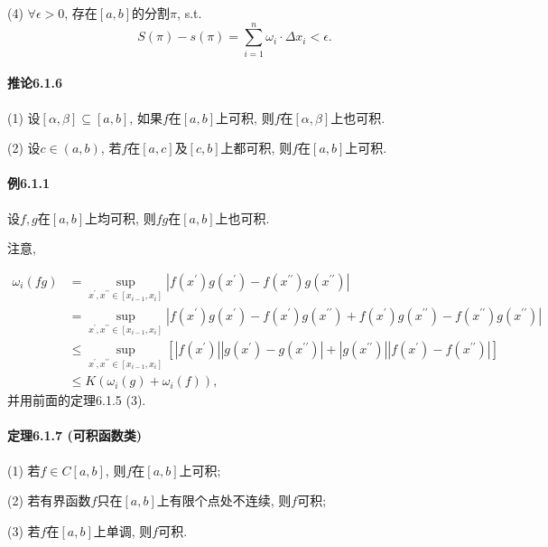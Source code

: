 (4) $\forall\epsilon>0$, 存在$[a,b]$的分割$\pi$, s.t.
\[
S(\pi)-s(\pi)=\sum_{i=1}^{n}\omega_{i}\cdot\Delta x_{i}<\epsilon.
\]


\paragraph{推论6.1.6}

(1) 设$[\alpha,\beta]\subseteq[a,b]$, 如果$f$在$[a,b]$上可积, 则$f$在$[\alpha,\beta]$上也可积.

(2) 设$c\in(a,b)$, 若$f$在$[a,c]$及$[c,b]$上都可积, 则$f$在$[a,b]$上可积.

\paragraph{例6.1.1}

设$f,g$在$[a,b]$上均可积, 则$fg$在$[a,b]$上也可积.

注意,

\[
\begin{aligned}\omega_{i}(fg) & =\sup_{x^{\prime},x^{\prime\prime}\in\left[x_{i-1},x_{i}\right]}\left|f\left(x^{\prime}\right)g\left(x^{\prime}\right)-f\left(x^{\prime\prime}\right)g\left(x^{\prime\prime}\right)\right|\\
	& =\sup_{x^{\prime},x^{\prime\prime}\in\left[x_{i-1},x_{i}\right]}\left|f\left(x^{\prime}\right)g\left(x^{\prime}\right)-f\left(x^{\prime}\right)g\left(x^{\prime\prime}\right)+f\left(x^{\prime}\right)g\left(x^{\prime\prime}\right)-f\left(x^{\prime\prime}\right)g\left(x^{\prime\prime}\right)\right|\\
	& \leqslant\sup_{x^{\prime},x^{\prime\prime}\in\left[x_{i-1},x_{i}\right]}\left[\left|f\left(x^{\prime}\right)\right|\left|g\left(x^{\prime}\right)-g\left(x^{\prime\prime}\right)\right|+\left|g\left(x^{\prime\prime}\right)\right|\left|f\left(x^{\prime}\right)-f\left(x^{\prime\prime}\right)\right|\right]\\
	& \leqslant K\left(\omega_{i}(g)+\omega_{i}(f)\right),
\end{aligned}
\]
并用前面的定理6.1.5 (3).

\paragraph{定理6.1.7 (可积函数类)}

(1) 若$f\in C[a,b]$, 则$f$在$[a,b]$上可积;

(2) 若有界函数$f$只在$[a,b]$上有限个点处不连续, 则$f$可积;

(3) 若$f$在$[a,b]$上单调, 则$f$可积.

